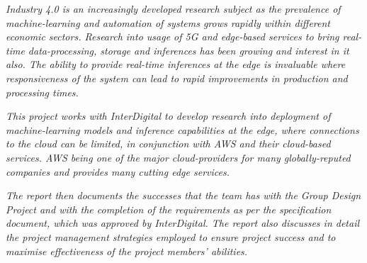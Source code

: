 \textit{Industry 4.0 is an increasingly developed research subject as the prevalence of machine-learning and automation of systems grows rapidly within different economic sectors\cite{pettinger_2019}. Research into usage of 5G and edge-based services to bring real-time data-processing, storage and inferences has been growing and interest in it also. The ability to provide real-time inferences at the edge is invaluable where responsiveness of the system can lead to rapid improvements in production and processing times.}

\textit{This project works with InterDigital to develop research into deployment of machine-learning models and inference capabilities at the edge, where connections to the cloud can be limited, in conjunction with AWS and their cloud-based services. AWS being one of the major cloud-providers for many globally-reputed companies and provides many cutting edge services.}

\textit{The report then documents the successes that the team has with the Group Design Project and with the completion of the requirements as per the specification document, which was approved by InterDigital. The report also discusses in detail the project management strategies employed to ensure project success and to maximise effectiveness of the project members' abilities.}

